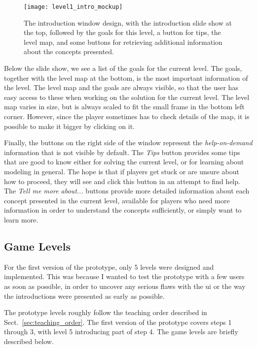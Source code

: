 \begin{figure}[htp]
	\centering
	\texttt{[image: level1\_intro\_mockup]}
	\caption[Introduction window mock-up]{The introduction window design, with the introduction slide show at the top, followed by the goals for this level, a button for tips, the level map, and some buttons for retrieving additional information about the concepts presented.}
	\label{fig:level1_intro_mockup}
\end{figure}

\noindent
Below the slide show, we see a list of the goals for the current level. The goals, together with the level map at the bottom, is the most important information of the level. The level map and the goals are always visible, so that the user has easy access to these when working on the solution for the current level. The level map varies in size, but is always scaled to fit the small frame in the bottom left corner. However, since the player sometimes has to check details of the map, it is possible to make it bigger by clicking on it.

\noindent
Finally, the buttons on the right side of the window represent the \emph{help-on-demand} information that is not visible by default. The \emph{Tips} button provides some tips that are good to know either for solving the current level, or for learning about modeling in general. The hope is that if players get stuck or are unsure about how to proceed, they will see and click this button in an attempt to find help. The \emph{Tell me more about...} buttons provide more detailed information about each concept presented in the current level, available for players who need more information in order to understand the concepts sufficiently, or simply want to learn more.

\subsection{Game Levels}
\label{sec:game_levels}
For the first version of the prototype, only 5 levels were designed and implemented. This was because I wanted to test the prototype with a few users as soon as possible, in order to uncover any serious flaws with the \gls{ui} or the way the introductions were presented as early as possible. 

\noindent
The prototype levels roughly follow the teaching order described in Sect.~\ref{sec:teaching_order}. The first version of the prototype covers steps 1 through 3, with level 5 introducing part of step 4. The game levels are briefly described below.

